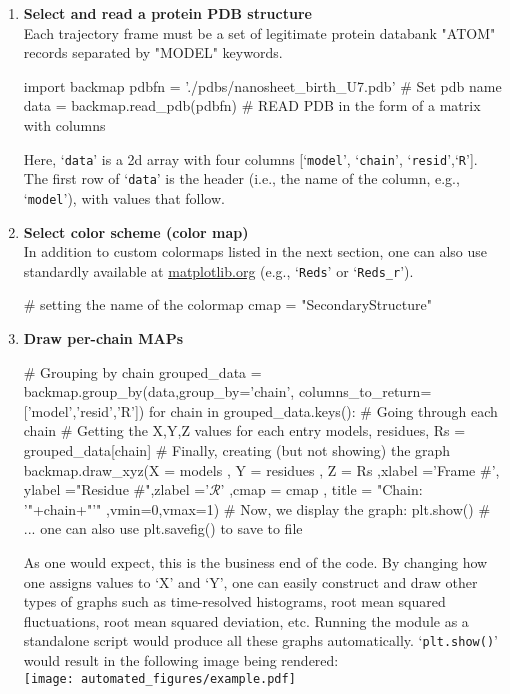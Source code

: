 \documentclass[fleqn,10pt,lineno]{wlpeerj} %
\def\ContinueLineNumber{\lstset{firstnumber=last}}
\newcommand{\code}[1]{\texttt{#1}\xspace}
\begin{document}
\begin{enumerate}
\item {\bf Select and read a protein PDB structure}\\
Each trajectory frame must be a set of legitimate protein databank "ATOM" records separated by "MODEL" keywords.
\begin{python}[firstnumber=1]
import backmap 
pdbfn = './pdbs/nanosheet_birth_U7.pdb' # Set pdb name 
data = backmap.read_pdb(pdbfn) # READ PDB in the form of a matrix with columns
\end{python}
Here, `\code{data}' is a 2d array with four columns [`\code{model}', `\code{chain}', `\code{resid}',`\code{R}']. 
The first row of `\code{data}' is the header (i.e., the name of the column, e.g., `\code{model}'), 
with values that follow.
\item {\bf Select color scheme (color map)}\\
In addition to custom colormaps listed in the next section, one can also use standardly available at 
\href{http://matplotlib.org/examples/color/colormaps_reference.htm}{matplotlib.org} (e.g., `\code{Reds}' or `\code{Reds\_r}').
\ContinueLineNumber
\begin{python}
# setting the name of the colormap
cmap = "SecondaryStructure"
\end{python}
\item {\bf Draw per-chain MAPs}
\ContinueLineNumber
\begin{python}
# Grouping by chain
grouped_data = backmap.group_by(data,group_by='chain',
                            columns_to_return=['model','resid','R'])
for chain in grouped_data.keys(): # Going through each chain
	# Getting the X,Y,Z values for each entry
	models, residues, Rs = grouped_data[chain]
	# Finally, creating (but not showing) the graph 
	backmap.draw_xyz(X = models  ,      Y = residues  ,     Z = Rs
	           ,xlabel ='Frame #', ylabel ="Residue #",zlabel ='$\mathcal{R}$'
	             ,cmap = cmap    ,  title = "Chain: '"+chain+"'"
	             ,vmin=0,vmax=1)
	# Now, we display the graph:
	plt.show() # ... one can also use plt.savefig() to save to file
\end{python}
As one would expect, this is the business end of the code. By changing how one assigns values to `X' and `Y', 
one can easily construct and draw other types of graphs such as time-resolved histograms, 
root mean squared fluctuations, root mean squared deviation, etc. 
Running the module as a standalone script would produce all these graphs automatically.
`\code{plt.show()}' would result in the following image being rendered:\\
\texttt{[image: automated\_figures/example.pdf]}
\end{enumerate}
\end{document}
